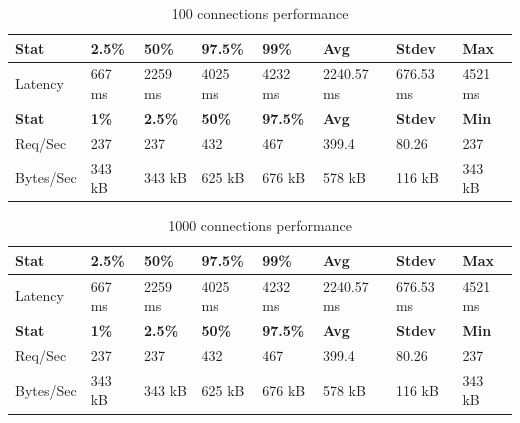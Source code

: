 \documentclass[../Main.tex]{subfiles}
\begin{document}
\begin{table}[H]
  \centering
\begin{tabular}{|l|l|l|l|l|l|l|l|}
\hline
\rowcolor[HTML]{f56b00}
\textbf{Stat} & \textbf{2.5\%} & \textbf{50\%} & \textbf{97.5\%} & \textbf{99\%} & \textbf{Avg} & \textbf{Stdev} & \textbf{Max} \\
\hline
Latency & 667 ms & 2259 ms & 4025 ms & 4232 ms & 2240.57 ms & 676.53 ms & 4521 ms \\
\hline
\rowcolor[HTML]{f56b00}
\textbf{Stat} & \textbf{1\%} & \textbf{2.5\%} & \textbf{50\%} & \textbf{97.5\%} & \textbf{Avg} & \textbf{Stdev} & \textbf{Min} \\
\hline
Req/Sec & 237 & 237 & 432 & 467 & 399.4 & 80.26 & 237 \\
Bytes/Sec & 343 kB & 343 kB & 625 kB & 676 kB & 578 kB & 116 kB & 343 kB \\
\hline
\end{tabular}
 \caption{100 connections performance}
 \label{100-connections-performance}
\end{table}

\begin{table}[H]
  \centering
\begin{tabular}{|l|l|l|l|l|l|l|l|}
\hline
\rowcolor[HTML]{f56b00}
\textbf{Stat} & \textbf{2.5\%} & \textbf{50\%} & \textbf{97.5\%} & \textbf{99\%} & \textbf{Avg} & \textbf{Stdev} & \textbf{Max} \\
\hline
Latency & 667 ms & 2259 ms & 4025 ms & 4232 ms & 2240.57 ms & 676.53 ms & 4521 ms \\
\hline
\rowcolor[HTML]{f56b00}
\textbf{Stat} & \textbf{1\%} & \textbf{2.5\%} & \textbf{50\%} & \textbf{97.5\%} & \textbf{Avg} & \textbf{Stdev} & \textbf{Min} \\
\hline
Req/Sec & 237 & 237 & 432 & 467 & 399.4 & 80.26 & 237 \\
Bytes/Sec & 343 kB & 343 kB & 625 kB & 676 kB & 578 kB & 116 kB & 343 kB \\
\hline
\end{tabular}
 \caption{1000 connections performance}
 \label{1000-connections-performance}
\end{table}
\end{document}
